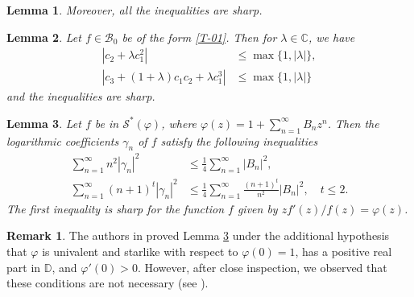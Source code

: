 \documentclass[a4paper,12pt]{amsart}
\newtheorem{lem}{Lemma}[section]
\theoremstyle{definition}
\newtheorem{rem}{Remark}[section]
\begin{document}
\begin{lem}
Moreover, all the inequalities are sharp.
\end{lem}





 \begin{lem}\label{T-200}\cite{2016-Iason}
 Let $f\in\mathcal{B}_0$ be of the form \eqref{T-01}. Then for $\lambda \in \mathbb{C} $, we have
\begin{align*}
|c_2+\lambda c_1^2| &\le  \max\{1, |\lambda|\},\\
|c_3+(1+\lambda) c_1c_2+\lambda c_1^3| &\le \max\{1, |\lambda|\}
\end{align*}
and the inequalities are sharp.
 \end{lem}







\begin{lem}\label{T-24}\cite{sharma-keong-ali-2024} Let $ f $ be in $ \mathcal{S}^*(\varphi)$, where $\varphi(z)=1+\sum_{n=1}^{\infty}B_nz^n $. Then the logarithmic coefficients $\gamma_n$ of $f$ satisfy the following inequalities
\begin{align*}
\sum_{n=1}^{\infty} n^2 |\gamma_n|^2 &\leq \frac{1}{4} \sum_{n=1}^{\infty} |B_n|^2,\\
\sum_{n=1}^{\infty} (n+1)^t |\gamma_n|^2 &\leq \frac{1}{4} \sum_{n=1}^{\infty} \frac{(n+1)^t}{n^2} |B_n|^2, \quad t \le 2.
\end{align*}
The first inequality is sharp for the function $ f $ given by  $ zf'(z)/f(z)=\varphi(z) $.
\end{lem}


\begin{rem}
The authors in \cite{sharma-keong-ali-2024} proved Lemma \ref{T-24} under the additional hypothesis that $\varphi$ is univalent and starlike with respect to $\varphi(0) = 1$, has a positive real part in $\mathbb{D}$, and $\varphi'(0) > 0$. However, after close inspection, we observed that these conditions are not necessary (see \cite[Theorems 2.2 and 2.3]{sharma-keong-ali-2024}).
\end{rem}
\end{document}
